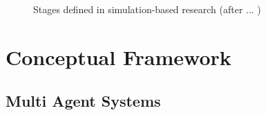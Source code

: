 \documentclass{report}
\begin{document}
\begin{figure}[tp]
\setlength\fboxsep{0pt}
\setlength\fboxrule{0.5pt}
\caption{Stages defined in simulation-based research (after ... )}
\label{fig:SimTL}
\end{figure}







\section{Conceptual Framework}

\subsection{Multi Agent Systems} %



\end{document}
